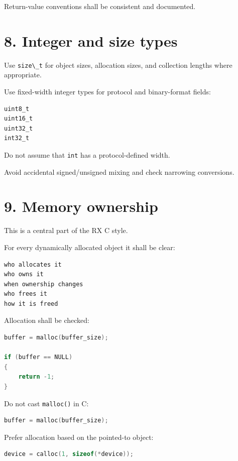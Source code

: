 \documentclass[11pt,a4paper]{article}
\begin{document}
Return-value conventions shall be consistent and documented.

\section{8. Integer and size types}\label{8-integer-and-size-types}

Use \passthrough{\lstinline!size\_t!} for object sizes, allocation
sizes, and collection lengths where appropriate.

Use fixed-width integer types for protocol and binary-format fields:

\begin{lstlisting}[language=C]
uint8_t
uint16_t
uint32_t
int32_t
\end{lstlisting}

Do not assume that \passthrough{\lstinline!int!} has a protocol-defined
width.

Avoid accidental signed/unsigned mixing and check narrowing conversions.

\section{9. Memory ownership}\label{9-memory-ownership}

This is a central part of the RX C style.

For every dynamically allocated object it shall be clear:

\begin{lstlisting}
who allocates it
who owns it
when ownership changes
who frees it
how it is freed
\end{lstlisting}

Allocation shall be checked:

\begin{lstlisting}[language=C]
buffer = malloc(buffer_size);

if (buffer == NULL)
{
    return -1;
}
\end{lstlisting}

Do not cast \passthrough{\lstinline!malloc()!} in C:

\begin{lstlisting}[language=C]
buffer = malloc(buffer_size);
\end{lstlisting}

Prefer allocation based on the pointed-to object:

\begin{lstlisting}[language=C]
device = calloc(1, sizeof(*device));
\end{lstlisting}
\end{document}
